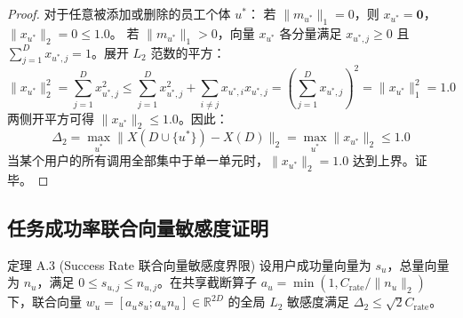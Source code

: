 \begin{proof}
对于任意被添加或删除的员工个体 $u^*$：
若 $\|m_{u^*}\|_1 = 0$，则 $x_{u^*} = \mathbf{0}$，$\|x_{u^*}\|_2 = 0 \le 1.0$。
若 $\|m_{u^*}\|_1 > 0$，向量 $x_{u^*}$ 各分量满足 $x_{u^*, j} \ge 0$ 且 $\sum_{j=1}^D x_{u^*, j} = 1$。展开 $L_2$ 范数的平方：
\begin{equation}
  \|x_{u^*}\|_2^2 = \sum_{j=1}^D x_{u^*, j}^2 \le \sum_{j=1}^D x_{u^*, j}^2 + \sum_{i \ne j} x_{u^*, i} x_{u^*, j} = \left(\sum_{j=1}^D x_{u^*, j}\right)^2 = \|x_{u^*}\|_1^2 = 1.0
\end{equation}
两侧开平方可得 $\|x_{u^*}\|_2 \le 1.0$。因此：
\begin{equation}
  \Delta_2 = \max_{u^*} \|X(D \cup \{u^*\}) - X(D)\|_2 = \max_{u^*} \|x_{u^*}\|_2 \le 1.0
\end{equation}
当某个用户的所有调用全部集中于单一单元时，$\|x_{u^*}\|_2 = 1.0$ 达到上界。证毕。
\end{proof}

\subsection{任务成功率联合向量敏感度证明}
\begin{techbox}{定理 A.3 (Success Rate 联合向量敏感度界限)}
设用户成功量向量为 $s_u$，总量向量为 $n_u$，满足 $0 \le s_{u, j} \le n_{u, j}$。在共享截断算子 $a_u = \min(1, C_{\text{rate}}/\|n_u\|_2)$ 下，联合向量 $w_u = [a_u s_u ; a_u n_u] \in \mathbb{R}^{2D}$ 的全局 $L_2$ 敏感度满足 $\Delta_2 \le \sqrt{2} C_{\text{rate}}$。
\end{techbox}

